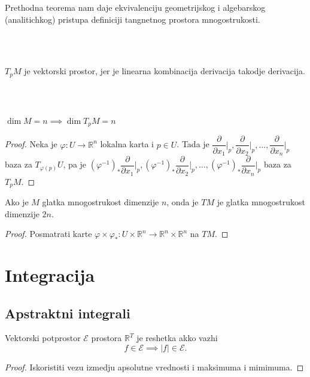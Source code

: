 \documentclass[a4paper,12pt]{article}
\newcommand{\RR}{\mathbb{R}}
\begin{document}
\begin{nap}
	Prethodna teorema nam daje ekvivalenciju geometrijskog i algebarskog (analitichkog) pristupa
	definiciji tangnetnog prostora mnogostrukosti.
\end{nap}
\\ \\
\begin{posl}
	$T_p M$ je vektorski prostor, jer je linearna kombinacija derivacija takodje derivacija.
\end{posl}
\\ \\
\begin{posl}
	$\dim M = n \implies \dim T_p M = n$
\end{posl}
\begin{proof}
	Neka je $\varphi : U \to \RR^n$ lokalna karta i $p \in U$. Tada je 
	$\dfrac{\partial }{\partial x_1} \Big|_p, \dfrac{\partial }{\partial x_2}\Big|_p, \dotso, \dfrac{\partial }{\partial x_n}\Big|_p$
	baza za $T_{\varphi(p)} U$, pa je 
	$(\varphi^{-1})_*\dfrac{\partial }{\partial x_1}\Big|_p, (\varphi^{-1})_*\dfrac{\partial }{\partial x_2}\Big|_p, \dotso, (\varphi^{-1})_*\dfrac{\partial }{\partial x_n}\Big|_p$
	baza za $T_p M$.
\end{proof}

\begin{tvr}
	Ako je $M$ glatka mnogostrukost dimenzije $n$, onda je $TM$ je glatka mnogostrukost dimenzije $2n$.
\end{tvr}
\begin{proof}
	Posmatrati karte $\varphi\times \varphi_* : U\times \RR^n \to \RR^n \times \RR^n$ na $TM$.
\end{proof}

\section{Integracija}

\subsection{Apstraktni integrali}

\begin{lema}
	Vektorski potprostor $\mathcal{E}$ prostora $\RR^T$ je reshetka akko vazhi
	\[ f \in \mathcal{E} \implies |f| \in \mathcal{E} .\]
\end{lema}
\begin{proof}
	Iskoristiti vezu izmedju apsolutne vrednosti i maksimuma i mimimuma.
\end{proof}
\end{document}
